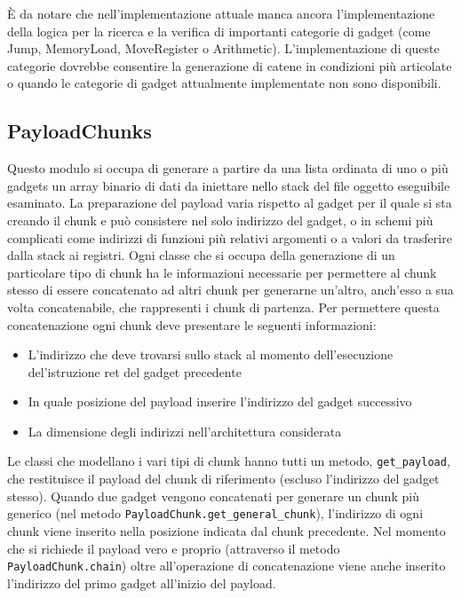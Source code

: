 È da notare che nell'implementazione attuale manca ancora
l'implementazione della logica per la ricerca e la verifica di
importanti categorie di gadget (come Jump, MemoryLoad, MoveRegister o
Arithmetic). L'implementazione di queste categorie dovrebbe consentire
la generazione di catene in condizioni più articolate o quando le
categorie di gadget attualmente implementate non sono disponibili.

\subsection{PayloadChunks}

Questo modulo si occupa di generare a partire da una lista ordinata di
uno o più gadgets un array binario di dati da iniettare nello stack
del file oggetto eseguibile esaminato. La preparazione del payload
varia rispetto al gadget per il quale si sta creando il chunk e può
consistere nel solo indirizzo del gadget, o in schemi più complicati
come indirizzi di funzioni più relativi argomenti o a valori da
trasferire dalla stack ai registri. Ogni classe che si occupa della
generazione di un particolare tipo di chunk ha le informazioni
necessarie per permettere al chunk stesso di essere concatenato ad
altri chunk per generarne un'altro, anch'esso a sua volta
concatenabile, che rappresenti i chunk di partenza. Per permettere
questa concatenazione ogni chunk deve presentare le seguenti
informazioni:


\begin{itemize}

\item L'indirizzo che deve trovarsi sullo stack al momento
  dell'esecuzione del'istruzione ret del gadget precedente 

\item In quale posizione del payload inserire l'indirizzo del gadget
  successivo

\item La dimensione degli indirizzi nell'architettura considerata

\end{itemize}


Le classi che modellano i vari tipi di chunk hanno tutti un metodo,
\lstinline{get_payload}, che restituisce il payload del chunk di
riferimento (escluso l'indirizzo del gadget stesso). Quando due gadget
vengono concatenati per generare un chunk più generico (nel metodo
\lstinline{PayloadChunk.get_general_chunk}), l'indirizzo di ogni chunk
viene inserito nella posizione indicata dal chunk precedente. Nel
momento che si richiede il payload vero e proprio (attraverso il
metodo \lstinline{PayloadChunk.chain}) oltre all'operazione di
concatenazione viene anche inserito l'indirizzo del primo gadget
all'inizio del payload.


